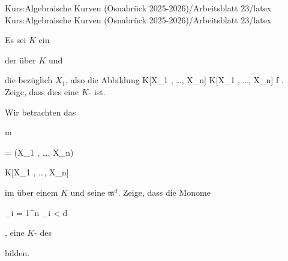 Kurs:Algebraische Kurven (Osnabrück 2025-2026)/Arbeitsblatt 23/latex
Kurs:Algebraische Kurven (Osnabrück 2025-2026)/Arbeitsblatt 23/latex

\setcounter{section}{23}





{}

{


Es sei $K$ ein


 der
über $K$ und

 die
 {} {}
bezüglich $X_1$, also die Abbildung
\maabbeledisp {} { K[X_1 , \ldots , X_n] } { K[X_1 , \ldots , X_n]
} { f } { {  }
} {.}
Zeige, dass dies eine
$K$-
ist.


}

{} {}



{}

{


Wir betrachten das


\mavergleichskettedisp

{\vergleichskette

{ {\mathfrak m}
}

{ =} { (X_1 , \ldots , X_n)
}

{ \subseteq} { K[X_1 , \ldots , X_n]
}

{ } {
}

{ } {
}

}
{}{}{}
im
über einem
$K$ und seine
${\mathfrak m}^d$. Zeige, dass die Monome


 {}

 {\sum_{i = 1}^n \nu_i < d} {}

 {} {} {} {,}
eine
$K$-
des


 bilden.


}

{} {}


